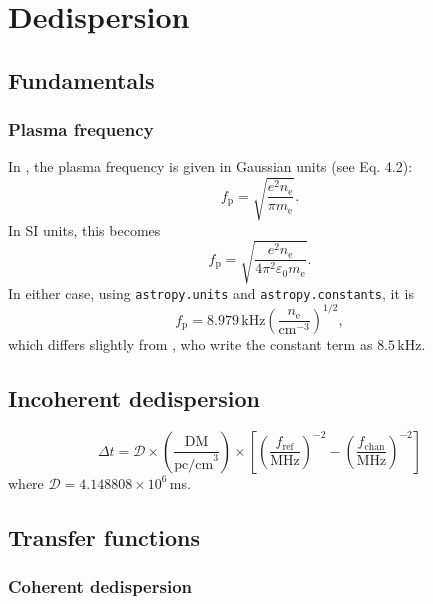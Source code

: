 \documentclass{book}
\begin{document}
\section{Dedispersion}

\subsection{Fundamentals}

\subsubsection{Plasma frequency}

In \citet{Lorimer2005}, the plasma frequency is given in Gaussian units (see Eq. 4.2):
\begin{equation}
    f_\text{p} = \sqrt{\frac{e^2 n_\text{e}}{\pi m_\text{e}}}.
\end{equation}
In SI units, this becomes
\begin{equation}
    f_\text{p} = \sqrt{\frac{e^2 n_\text{e}}{4\pi^2\varepsilon_0 m_\text{e}}}.
\end{equation}
In either case, using \texttt{astropy.units} and \texttt{astropy.constants}, it is
\begin{equation}
    f_\text{p} = 8.979\,\text{kHz} \left(\frac{n_\text{e}}{\text{cm}^{-3}}\right)^{1/2},
\end{equation}
which differs slightly from \citeauthor{Lorimer2005}, who write the constant term as $8.5\,$kHz.

\subsection{Incoherent dedispersion}

\begin{equation}
    \Delta t
        = \mathcal{D} \times
          \left(\frac{\text{DM}}{\text{pc/cm}^3}\right) \times \left[
              \left(\frac{f_\text{ref}}{\text{MHz}}\right)^{-2} -
              \left(\frac{f_\text{chan}}{\text{MHz}}\right)^{-2} \right]
\end{equation}
where $\mathcal{D} = 4.148808 \times 10^6\,$ms.

\subsection{Transfer functions}

\subsubsection{Coherent dedispersion}
\end{document}
